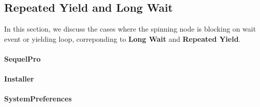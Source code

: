 \subsection{Repeated Yield and Long Wait}
In this section, we discuss the cases where the spinning node is blocking on
wait event or yielding loop, correponding to \textbf{Long Wait} and \textbf{Repeated Yield}.
\paragraph{SequelPro}

\paragraph{Installer}

\paragraph{SystemPreferences}

